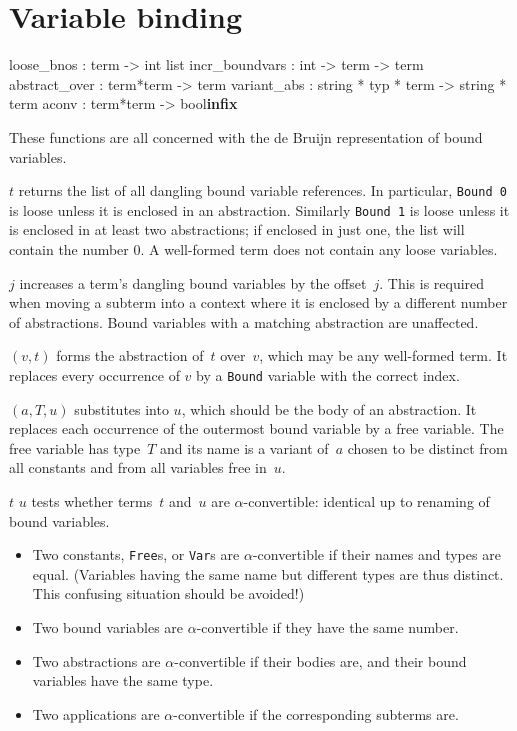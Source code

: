 \section{Variable binding}
\begin{ttbox}
loose_bnos     : term -> int list
incr_boundvars : int -> term -> term
abstract_over  : term*term -> term
variant_abs    : string * typ * term -> string * term
aconv          : term*term -> bool\hfill{\bf infix}
\end{ttbox}
These functions are all concerned with the de Bruijn representation of
bound variables.
\begin{ttdescription}
\item[\ttindexbold{loose_bnos} $t$]
  returns the list of all dangling bound variable references.  In
  particular, {\tt Bound~0} is loose unless it is enclosed in an
  abstraction.  Similarly {\tt Bound~1} is loose unless it is enclosed in
  at least two abstractions; if enclosed in just one, the list will contain
  the number 0.  A well-formed term does not contain any loose variables.

\item[\ttindexbold{incr_boundvars} $j$]
  increases a term's dangling bound variables by the offset~$j$.  This is
  required when moving a subterm into a context where it is enclosed by a
  different number of abstractions.  Bound variables with a matching
  abstraction are unaffected.

\item[\ttindexbold{abstract_over} $(v,t)$]
  forms the abstraction of~$t$ over~$v$, which may be any well-formed term.
  It replaces every occurrence of \(v\) by a {\tt Bound} variable with the
  correct index.

\item[\ttindexbold{variant_abs} $(a,T,u)$]
  substitutes into $u$, which should be the body of an abstraction.
  It replaces each occurrence of the outermost bound variable by a free
  variable.  The free variable has type~$T$ and its name is a variant
  of~$a$ chosen to be distinct from all constants and from all variables
  free in~$u$.

\item[$t$ \ttindexbold{aconv} $u$]
  tests whether terms~$t$ and~$u$ are \(\alpha\)-convertible: identical up
  to renaming of bound variables.
\begin{itemize}
  \item
    Two constants, {\tt Free}s, or {\tt Var}s are \(\alpha\)-convertible
    if their names and types are equal.
    (Variables having the same name but different types are thus distinct.
    This confusing situation should be avoided!)
  \item
    Two bound variables are \(\alpha\)-convertible
    if they have the same number.
  \item
    Two abstractions are \(\alpha\)-convertible
    if their bodies are, and their bound variables have the same type.
  \item
    Two applications are \(\alpha\)-convertible
    if the corresponding subterms are.
\end{itemize}

\end{ttdescription}

